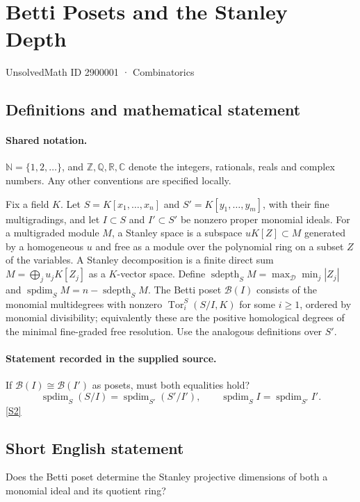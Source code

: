 \documentclass[11pt]{article}
\newcommand{\sref}[2]{\hyperlink{source:#1:#2}{[S#2]}}
\begin{document}
\setcounter{section}{2900000}
\section{Betti Posets and the Stanley Depth}\label{2900001}
{\small\sffamily UnsolvedMath ID 2900001 · Combinatorics}
\subsection{Definitions and mathematical statement}

\paragraph{Shared notation.}$\mathbb N=\{1,2,\ldots\}$, and $\mathbb Z,\mathbb Q,\mathbb R,\mathbb C$ denote the integers, rationals, reals and complex numbers. Any other conventions are specified locally.


Fix a field $K$. Let $S=K[x_1,\ldots,x_n]$ and $S'=K[y_1,\ldots,y_m]$, with their fine multigradings, and let $I\subset S$ and $I'\subset S'$ be nonzero proper monomial ideals. For a multigraded module $M$, a Stanley space is a subspace $uK[Z]\subset M$ generated by a homogeneous $u$ and free as a module over the polynomial ring on a subset $Z$ of the variables. A Stanley decomposition is a finite direct sum $M=\bigoplus_j u_jK[Z_j]$ as a $K$-vector space. Define $\operatorname{sdepth}_S M=\max_{\mathcal D}\min_j|Z_j|$ and $\operatorname{spdim}_S M=n-\operatorname{sdepth}_S M$. The Betti poset $\mathcal B(I)$ consists of the monomial multidegrees with nonzero $\operatorname{Tor}_i^S(S/I,K)$ for some $i\ge1$, ordered by monomial divisibility; equivalently these are the positive homological degrees of the minimal fine-graded free resolution. Use the analogous definitions over $S'$.
\paragraph{Statement recorded in the supplied source.}
If $\mathcal B(I)\cong\mathcal B(I')$ as posets, must both equalities hold? \[\operatorname{spdim}_S(S/I)=\operatorname{spdim}_{S'}(S'/I'),\qquad \operatorname{spdim}_S I=\operatorname{spdim}_{S'}I'.\] \sref{2900001}{2}
\subsection{Short English statement}
Does the Betti poset determine the Stanley projective dimensions of both a monomial ideal and its quotient ring?
\end{document}
